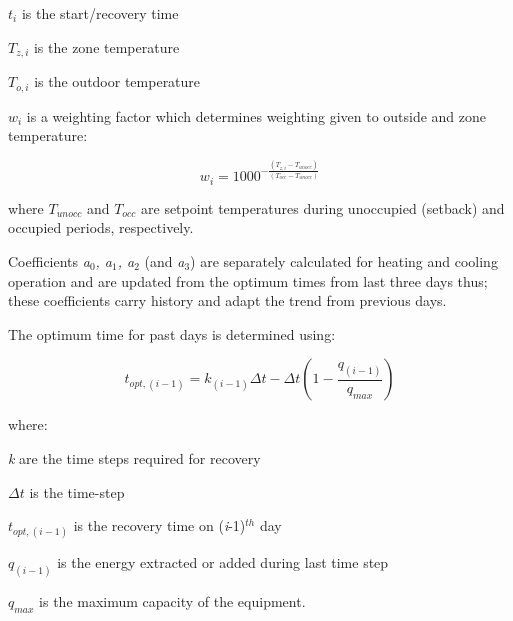 \(t_{i}\) is the start/recovery time

\(T_{z,i}\) is the zone temperature

\(T_{o,i}\) is the outdoor temperature

\(w_{i}\) is a weighting factor which determines weighting given to outside and zone temperature:

\begin{equation}
{w_i} = {1000^{ - \frac{{\left( {{T_{z,i}} - {T_{unocc}}} \right)}}{{\left( {{T_{occ}} - {T_{unocc}}} \right)}}}}
\end{equation}

where \(T_{unocc}\) and \(T_{occ}\) are setpoint temperatures during unoccupied (setback) and occupied periods, respectively.

Coefficients \emph{a\(_{0}\), a\(_{1}\), a\(_{2}\)} (and \emph{a\(_{3}\)}) are separately calculated for heating and cooling operation and are updated from the optimum times from last three days thus; these coefficients carry history and adapt the trend from previous days.

The optimum time for past days is determined using:

\begin{equation}
{t_{opt,\left( {i - 1} \right)}} = {k_{\left( {i - 1} \right)}}\Delta t - \Delta t\left( {1 - \frac{{{q_{\left( {i - 1} \right)}}}}{{{q_{max}}}}} \right)
\end{equation}

where:

\emph{k} are the time steps required for recovery

\({\Delta t}\) is the time-step

\(t_{opt,(i-1)}\) is the recovery time on (\emph{i}-1)\(^{th}\) day

\(q_{(i-1)}\) is the energy extracted or added during last time step

\(q_{max}\) is the maximum capacity of the equipment.
